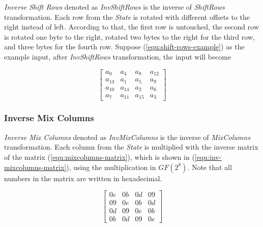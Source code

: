 \documentclass[a4paper, 10pt]{article}
\begin{document}
\begin{multicols}{2}
            \textit{Inverse Shift Rows} denoted as \textit{InvShiftRows} is the inverse of \textit{ShiftRows} transformation. Each row from the \textit{State} is rotated with different offsets to the right instead of left. According to that, the first row is untouched, the second row is rotated one byte to the right, rotated two bytes to the right for the third row, and three bytes for the fourth row. Suppose (\ref{equ:shift-rows-example}) as the example input, after \textit{InvShiftRows} transformation, the input will become

            \begin{equation}
                \begin{bmatrix}
                    a_{0} & a_{4} & a_{8} & a_{12}\\
                    a_{13} & a_{1} & a_{5} & a_{9}\\
                    a_{10} & a_{14} & a_{2} & a_{6}\\
                    a_{7} & a_{11} & a_{15} & a_{3}
                \end{bmatrix}
            \end{equation}

            \subsubsection{Inverse Mix Columns}
	\label{sec:invmixcolumns}

            \textit{Inverse Mix Columns} denoted as \textit{InvMixColumns} is the inverse of \textit{MixColumns} transformation. Each column from the \textit{State} is multiplied with the inverse matrix of the matrix (\ref{equ:mixcolumns-matrix}), which is shown in (\ref{equ:inv-mixcolumns-matrix}), using the multiplication in \textit{$GF(2^{8})$}. Note that all numbers in the matrix are written in hexadecimal.

            \begin{equation}
                \begin{bmatrix}
                    0e & 0b & 0d & 09\\
                    09 & 0e & 0b & 0d\\
                    0d & 09 & 0e & 0b\\
                    0b & 0d & 09 & 0e
                \end{bmatrix}
                \label{equ:inv-mixcolumns-matrix}
            \end{equation}


\end{multicols}
\end{document}
